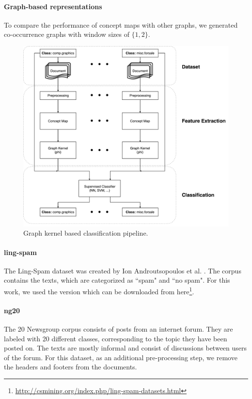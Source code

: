 
\paragraph{Graph-based representations}
To compare the performance of concept maps with other graphs, we generated co-occurrence graphs with window sizes of $\{1, 2\}$.


\begin{figure}[ht]
\centering\includegraphics[width=0.6\linewidth]{assets/figures/approach.pdf}
\caption{Graph kernel based classification pipeline.}
\end{figure}


\paragraph{ling-spam}
The Ling-Spam dataset was created by Ion Androutsopoulos et al. \cite{Androutsopoulos2000}.
The corpus contains the texts, which are categorized as ``spam" and ``no spam". For this work, we used the version which can be downloaded from here\footnote{\url{http://csmining.org/index.php/ling-spam-datasets.html}}.

\paragraph{ng20}
The 20 Newsgroup corpus \cite{Lang} consists of posts from an internet forum. They are labeled with 20 different classes, corresponding to the topic they have been posted on. The texts are mostly informal and consist of discussions between users of the forum.
For this dataset, as an additional pre-processing step, we remove the headers and footers from the documents.

